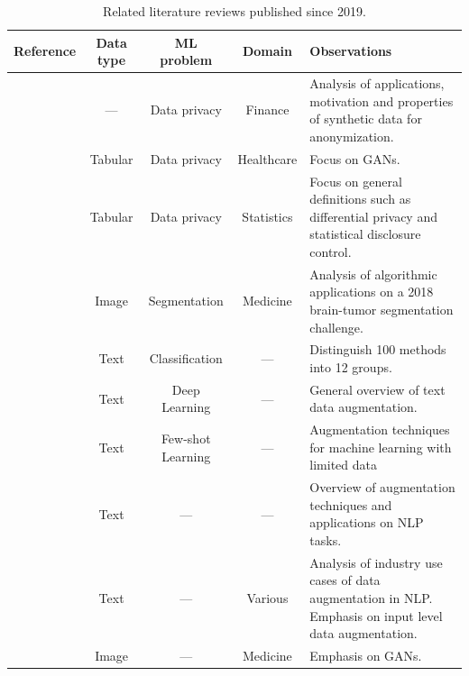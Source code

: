 \begin{table}[t!]
    \centering
    \caption{\label{tab:literature-reviews}
        Related literature reviews published since 2019.
    }
    \small{%
    \begin{tabularx}{\textwidth}{@{}rcccX@{}}
        \toprule
        Reference & Data type & ML problem & Domain & Observations \\
        \midrule

        \citet{assefa2020generating} & --- & Data privacy &
        Finance & Analysis of applications, motivation and properties of
        synthetic data for anonymization. \\

        \citet{hernandez2022synthetic} & Tabular & Data privacy &
        Healthcare & Focus on GANs. \\

        \citet{raghunathan2021synthetic} & Tabular & Data privacy &
        Statistics & Focus on general definitions such as differential privacy
        and statistical disclosure control.\\

        \citet{nalepa2019data} & Image & Segmentation & Medicine & Analysis of
        algorithmic applications on a 2018 brain-tumor segmentation
        challenge.\\

        \citet{bayer2021survey} & Text & Classification & --- & Distinguish
        100 methods into 12 groups. \\

        \citet{shorten2021text} & Text & Deep Learning & --- & General
        overview of text data augmentation. \\

        \citet{chen2021empirical} & Text & Few-shot Learning & --- &
        Augmentation techniques for machine learning with limited data\\

        \citet{feng2021survey} & Text & --- & --- & Overview of augmentation
        techniques and applications on NLP tasks.\\

        \citet{liu2020survey} & Text & --- & Various & Analysis of industry
        use cases of data augmentation in NLP\@. Emphasis on input level data
        augmentation.\\

        \citet{yi2019generative} & Image & --- & Medicine & Emphasis on GANs.\\


\end{tabularx}}
\end{table}
